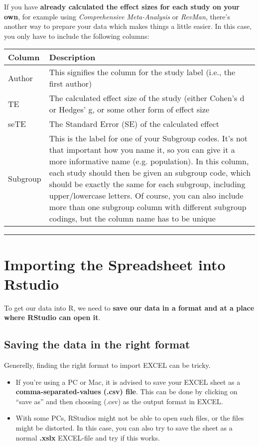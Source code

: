 \documentclass[]{book}
\providecommand{\tightlist}{%
  \setlength{\itemsep}{0pt}\setlength{\parskip}{0pt}}
\theoremstyle{definition}
\theoremstyle{definition}
\theoremstyle{definition}
\theoremstyle{remark}
\begin{document}
If you have \textbf{already calculated the effect sizes for each study
on your own}, for example using \emph{Comprehensive Meta-Analysis} or
\emph{RevMan}, there's another way to prepare your data which makes
things a little easier. In this case, you only have to include the
following columns:

\begin{tabular}{l|l}
\hline
Column & Description\\
\hline
Author & This signifies the column for the study label (i.e., the first author)\\
\hline
TE & The calculated effect size of the study (either Cohen's d or Hedges' g, or some other form of effect size\\
\hline
seTE & The Standard Error (SE) of the calculated effect\\
\hline
Subgroup & This is the label for one of your Subgroup codes. It's not that important how you name it, so you can give it a more informative name (e.g. population). In this column, each study should then be given an subgroup code, which should be exactly the same for each subgroup, including upper/lowercase letters. Of course, you can also include more than one subgroup column with different subgroup codings, but the column name has to be unique\\
\hline
\end{tabular}

\begin{center}\rule{0.5\linewidth}{\linethickness}\end{center}

\hypertarget{import_excel}{\section{Importing the Spreadsheet into
Rstudio}\label{import_excel}}

To get our data into R, we need to \textbf{save our data in a format and
at a place where RStudio can open it}.

\subsection{Saving the data in the right
format}\label{saving-the-data-in-the-right-format}

Generelly, finding the right format to import EXCEL can be tricky.

\begin{itemize}
\tightlist
\item
  If you're using a PC or Mac, it is advised to save your EXCEL sheet as
  a \textbf{comma-separated-values (.csv) file}. This can be done by
  clicking on ``save as'' and then choosing (.csv) as the output format
  in EXCEL.
\item
  With some PCs, RStudios might not be able to open such files, or the
  files might be distorted. In this case, you can also try to save the
  sheet as a normal \textbf{.xslx} EXCEL-file and try if this works.
\end{itemize}
\end{document}
